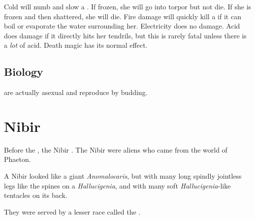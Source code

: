 Cold will numb and slow a \naiad{}. If frozen, she will go into torpor but not die. If she is frozen and then shattered, she will die. Fire damage will quickly kill a \naiad{} if it can boil or evaporate the water surrounding her. Electricity does no damage. Acid does damage if it directly hits her tendrils, but this is rarely fatal unless there is a \emph{lot} of acid. Death magic has its normal effect. 









\subsection{Biology}
\Naiads{} are actually asexual and reproduce by budding. 
































\section{Nibir}
%
Before the \ophidians, the Nibir . 
The Nibir were aliens who came from the world of Phaeton. 

A Nibir looked like a giant \emph{Anomalocaris}, but with many long spindly jointless legs like the spines on a \emph{Hallucigenia}, and with many soft \emph{Hallucigenia}-like tentacles on its back. 

They were served by a lesser race called the . 
















